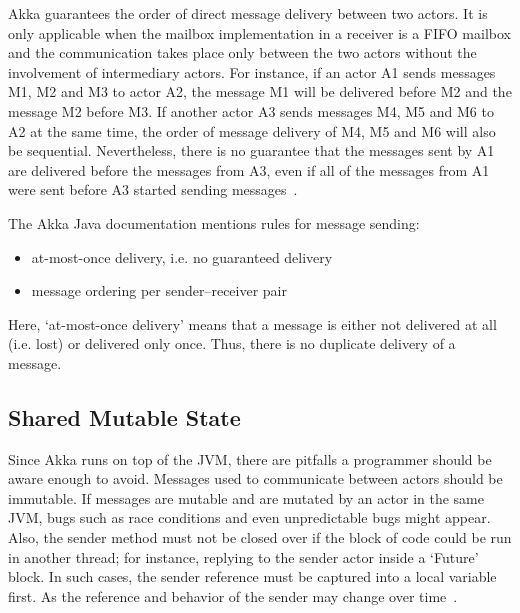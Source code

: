  Akka guarantees the order of direct message delivery between two actors. It is only applicable when the mailbox implementation in a receiver is a FIFO mailbox and the communication takes place only between the two actors without the involvement of intermediary actors. For instance, if an actor A1 sends messages M1, M2 and M3 to actor A2, the message M1 will be delivered before M2 and the message M2 before M3. If another actor A3 sends messages M4, M5 and M6 to A2 at the same time, the order of message delivery of M4, M5 and M6 will also be sequential. Nevertheless, there is no guarantee that the messages sent by A1 are delivered before the messages from A3, even if all of the messages from A1 were sent before A3 started sending messages~\cite{akkaJavaDoc}.

  The Akka Java documentation mentions rules for message sending: \cite{akkaJavaDoc}
  \begin{itemize}
    \item at-most-once delivery, i.e. no guaranteed delivery
    \item message ordering per sender–receiver pair
  \end{itemize}

Here, ‘at-most-once delivery’ means that a message is either not delivered at all (i.e. lost) or delivered only once. Thus, there is no duplicate delivery of a message.

  \subsection{Shared Mutable State}
  Since Akka runs on top of the JVM, there are pitfalls a programmer should be aware enough to avoid. Messages used to communicate between actors should be immutable. If messages are mutable and are mutated by an actor in the same JVM, bugs such as race conditions and even unpredictable bugs might appear. Also, the sender method must not be closed over if the block of code could be run in another thread; for instance, replying to the sender actor inside a ‘Future’ block. In such cases, the sender reference must be captured into a local variable first. As the reference and behavior of the sender may change over time~\cite{akkaJavaDoc}.

